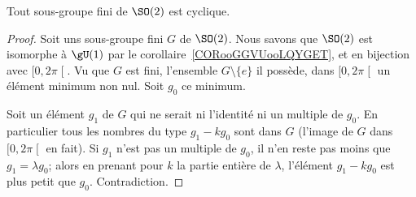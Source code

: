 \begin{lemma}        \label{LEMooUKEVooAEWvlM}
    Tout sous-groupe fini de \( \SO(2)\) est cyclique.
\end{lemma}

\begin{proof}
    Soit uns sous-groupe fini \(G\) de \( \SO(2)\).  Nous savons que \( \SO(2)\) est isomorphe à \( \gU(1)\) par le corollaire~\ref{CORooGGVUooLQYGET}, et en bijection avec \( \mathopen[ 0 , 2\pi \mathclose[\). Vu que \( G\) est fini, l'ensemble \( G\setminus\{ e \}\) il possède, dans \( \mathopen[ 0 , 2\pi \mathclose[\) un élément minimum non nul. Soit \( g_0\) ce minimum.

        Soit un élément \( g_1\) de \( G\) qui ne serait ni l'identité ni un multiple de \( g_0\). En particulier tous les nombres du type \( g_1-kg_0\) sont dans \( G\) (l'image de \( G\) dans \( \mathopen[ 0 , 2\pi \mathclose[\) en fait). Si \( g_1\) n'est pas un multiple de \( g_0\), il n'en reste pas moins que \( g_1=\lambda g_0\); alors en prenant pour \( k\) la partie entière de \( \lambda\), l'élément \( g_1-kg_0\) est plus petit que \( g_0\). Contradiction.
\end{proof}
